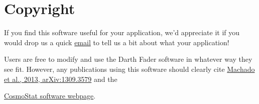 \documentclass[a4paper]{article}
\begin{document}
\section{Copyright}

If you find this software useful for your application, we'd appreciate
it if you would drop us a quick
\href{mailto:adrienne.leonard@cea.fr}{email} to tell us a bit about
what your application!

Users are free to modify and use the Darth Fader software in whatever
way they see fit. However, any publications using this software should
clearly cite {\color{blue}
  \href{http://arxiv.org/abs/1309.3579}{Machado et al., 2013,
    arXiv:1309.3579}} and the
    
{\color{blue}\noindent\href{http://cosmostat.org/software.html}{CosmoStat software
  webpage}.} 
\end{document}
